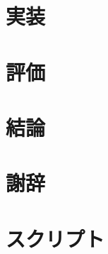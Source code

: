 \documentclass[12pt]{b-thesis}
\begin{document}
\chapter{実装}
\label{chap:implementation}


\chapter{評価}
\label{chap:evaluation}


\chapter{結論}
\label{chap:conclusion}


\label{chap:thanks}
\chapter*{謝辞}


\thispagestyle{plain}



\appendix
\def\thechapter{付録\Alph{chapter}}
\chapter{スクリプト}
\label{chap:appendix}
\def\thechapter{\Alph{chapter}}

\end{document}
